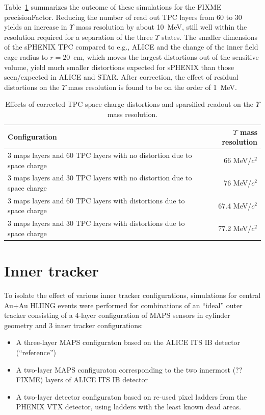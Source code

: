 Table~\ref{tab:upsilon_mass_resolution} summarizes the outcome of these simulations for the FIXME precisionFactor. Reducing the number of 
read out TPC layers from 60 to 30 yields an increase in $\Upsilon$ mass resolution by about 10~MeV, still well within the resolution required
for a separation of the three $\Upsilon$ states. The smaller dimensions of the sPHENIX TPC compared to e.g., ALICE and the change of the inner
field cage radius to $r = 20$~cm, which moves the largest distortions out of the sensitive volume, yield much smaller distortions expected
for sPHENIX than those seen/expected in ALICE and STAR. After correction, the effect of residual distortions on the $\Upsilon$ mass resolution is 
found to be on the order of 1~MeV.

\begin{table}
  \centering
  \begin{tabular}{lr}
    \toprule
    Configuration & $\Upsilon$ mass resolution \\
    \midrule
3 maps layers and 60 TPC layers with no distortion due to space charge
&  66 MeV/$c^2$ \\
3 maps layers and 30 TPC layers with no distortion due to space charge
& 76 MeV/$c^2$ \\
3 maps layers and 60 TPC layers with distortions due to space charge
& 67.4 MeV/$c^2$ \\
3 maps layers and 30 TPC layers with distortions due to space charge
& 77.2 MeV/$c^2$ \\
    \bottomrule
  \end{tabular}
  \caption{Effects of corrected TPC space charge distortions and sparsified readout on the $\Upsilon$ mass resolution.}
  \label{tab:upsilon_mass_resolution}
\end{table}



\section{Inner tracker}
\label{sec:innertracker}

To isolate the effect of various inner tracker configurations, simulations for central Au+Au HIJING events were performed for 
combinations of an ``ideal'' outer tracker consisting of a 4-layer configuration of MAPS sensors in cylinder geometry and 
3 inner tracker configurations:
\begin{itemize}
\item A three-layer MAPS configuraton based on the ALICE ITS IB detector (``reference'')
\item A two-layer MAPS configuraton corresponding to the two innermost (?? FIXME) layers of ALICE ITS IB detector
\item A two-layer detector configuraton based on re-used pixel ladders from the PHENIX VTX detector, using ladders with
the least known dead areas. 
\end{itemize}

